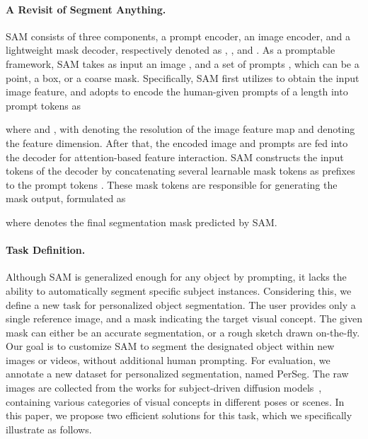 \documentclass{article} \usepackage{iclr2024_conference,times}
\begin{document}
\paragraph{A Revisit of Segment Anything.} 
SAM consists of three components, a prompt encoder, an image encoder, and a lightweight mask decoder, respectively denoted as , , and . 
As a promptable framework, SAM takes as input an image , and a set of prompts , which can be a point, a box, or a coarse mask. Specifically, SAM first utilizes  to obtain the input image feature, and adopts  to encode the human-given prompts of a length  into prompt tokens as

where  and , with  denoting the resolution of the image feature map and  denoting the feature dimension.
After that, the encoded image and prompts are fed into the decoder  for attention-based feature interaction. SAM constructs the input tokens of the decoder by concatenating several learnable mask tokens  as prefixes to the prompt tokens . These mask tokens are responsible for generating the mask output, formulated as

where  denotes the final segmentation mask predicted by SAM.

\paragraph{Task Definition.} 
Although SAM is generalized enough for any object by prompting, it lacks the ability to automatically segment specific subject instances. Considering this, we define a new task for personalized object segmentation. The user provides only a single reference image, and a mask indicating the target visual concept. The given mask can either be an accurate segmentation, or a rough sketch drawn on-the-fly. Our goal is to customize SAM to segment the designated object within new images or videos, without additional human prompting. 
For evaluation, we annotate a new dataset for personalized segmentation, named PerSeg. The raw images are collected from the works for subject-driven diffusion models~\citep{gal2022image,ruiz2022dreambooth,kumari2022multi}, containing various categories of visual concepts in different poses or scenes. In this paper, we propose two efficient solutions for this task, which we specifically illustrate as follows.
\end{document}
